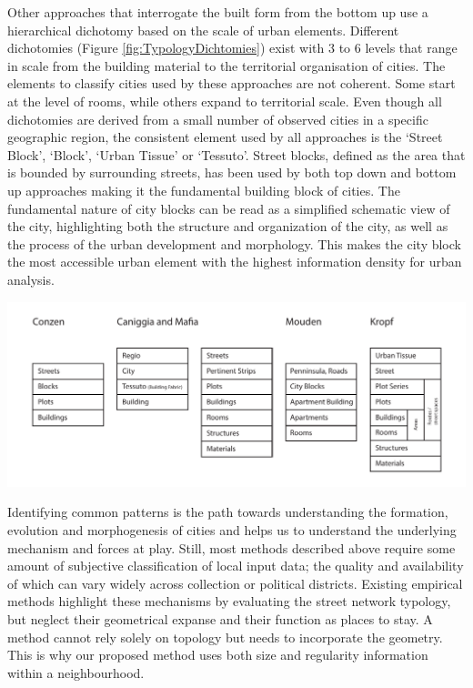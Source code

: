 \documentclass{nature}
\makeatletter
\renewenvironment*{figure}{\@float{figure}}{\end@float}
\makeatother
\begin{document}
Other approaches that interrogate the built form from the bottom up use a hierarchical dichotomy based on the scale of urban elements. Different dichotomies (Figure \ref{fig:TypologyDichtomies}) exist with 3 to 6 levels that range in scale from the building material to the territorial organisation of cities\cite{Lynch1981,Conzen1960,Caniggi1979,Castex1980,Mouden1988,Allain2004}. The elements  to classify cities used by these approaches are not coherent. Some start at the level of rooms, while others expand to territorial scale. Even though all dichotomies are derived from a small number of observed cities in a specific geographic region, the consistent element used by all approaches is the `Street Block', `Block', `Urban Tissue' or `Tessuto'. Street blocks, defined as the area that is bounded by surrounding streets, has been used by both top down and bottom up approaches making it the fundamental building block of cities. The fundamental nature of city blocks can be read as a simplified schematic view of the city\cite{Southworth2013}, highlighting both the structure and organization of the city, as well as the process of the urban development and morphology. This makes the city block the most accessible urban element with the highest information density for urban analysis.  

\begin{figure}
\centering    
\includegraphics[scale=0.80,page=1]{Images/Typology_Dichtomies.pdf}  
\caption{\bf Different scales of dichotomies. }    
 \label{fig:TypologyDichtomies}  
\end{figure} 

Identifying common patterns is the path towards understanding the formation, evolution and morphogenesis of cities and helps us to understand the underlying mechanism and forces at play. Still, most methods described above require some amount of subjective classification of local input data; the quality and availability of which can vary widely across collection or political districts. Existing empirical methods highlight these mechanisms by evaluating the street network typology\cite{Hillier1989}, but neglect their geometrical expanse and their function as places to stay. A method cannot rely solely on topology but needs to incorporate the geometry\cite{Louf2014a}. This is why our proposed method uses both size and regularity information within a neighbourhood.  
\end{document}
